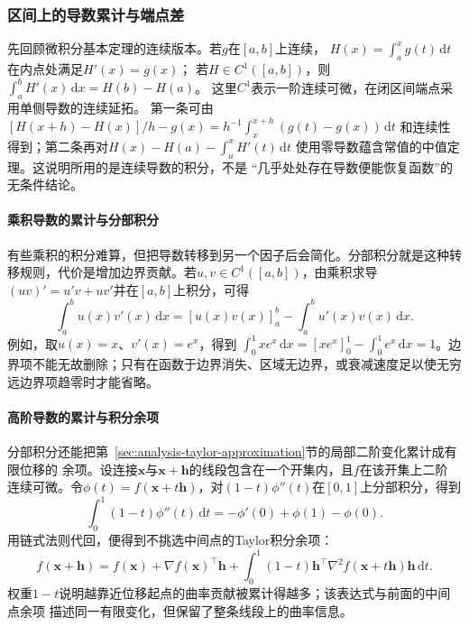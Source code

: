 \subsubsection{区间上的导数累计与端点差}
\label{sec:analysis-integration-remainders}

先回顾微积分基本定理的连续版本。若$g$在$[a,b]$上连续，
$H(x)=\int_a^xg(t)\,\mathrm dt$在内点处满足$H'(x)=g(x)$；
若$H\in C^1([a,b])$，则$\int_a^bH'(x)\,\mathrm dx=H(b)-H(a)$。
这里$C^1$表示一阶连续可微，在闭区间端点采用单侧导数的连续延拓。
第一条可由
$[H(x+h)-H(x)]/h-g(x)=h^{-1}\int_x^{x+h}(g(t)-g(x))\,\mathrm dt$
和连续性得到；第二条再对$H(x)-H(a)-\int_a^xH'(t)\,\mathrm dt$
使用零导数蕴含常值的中值定理。这说明所用的是连续导数的积分，不是
“几乎处处存在导数便能恢复函数”的无条件结论。

\paragraph{乘积导数的累计与分部积分}
有些乘积的积分难算，但把导数转移到另一个因子后会简化。分部积分就是这种转移规则，代价是增加边界贡献。若$u,v\in C^1([a,b])$，由乘积求导$(uv)'=u'v+uv'$并在$[a,b]$上积分，可得
\begin{equation}
  \int_a^b u(x)v'(x)\,\mathrm{d}x
  =
  [u(x)v(x)]_a^b
  -
  \int_a^b u'(x)v(x)\,\mathrm{d}x.
\label{eq:analysis-integration-by-parts}
\end{equation}
例如，取$u(x)=x$、$v'(x)=e^x$，得到 $\int_0^1xe^x\,\mathrm{d}x=[xe^x]_0^1-\int_0^1e^x\,\mathrm{d}x=1$。边界项不能无故删除；只有在函数于边界消失、区域无边界，或衰减速度足以使无穷远边界项趋零时才能省略。

\paragraph{高阶导数的累计与积分余项}
分部积分还能把第~\ref{sec:analysis-taylor-approximation}节的局部二阶变化累计成有限位移的
余项。设连接$\bm{x}$与$\bm{x}+\bm{h}$的线段包含在一个开集内，且$f$在该开集上二阶
连续可微。令$\phi(t)=f(\bm{x}+t\bm{h})$，对$(1-t)\phi''(t)$在$[0,1]$上分部积分，得到
\[
  \int_0^1(1-t)\phi''(t)\,\mathrm{d}t
  =-\phi'(0)+\phi(1)-\phi(0).
\]
用链式法则代回，便得到不挑选中间点的Taylor积分余项：
\[   f(\bm{x}+\bm{h})   =   f(\bm{x})   +\nabla f(\bm{x})^{\top}\bm{h}   +   \int_0^1(1-t)   \bm{h}^{\top}\nabla^2f(\bm{x}+t\bm{h})\bm{h}\,\mathrm{d}t. \]
权重$1-t$说明越靠近位移起点的曲率贡献被累计得越多；该表达式与前面的中间点余项
描述同一有限变化，但保留了整条线段上的曲率信息。

